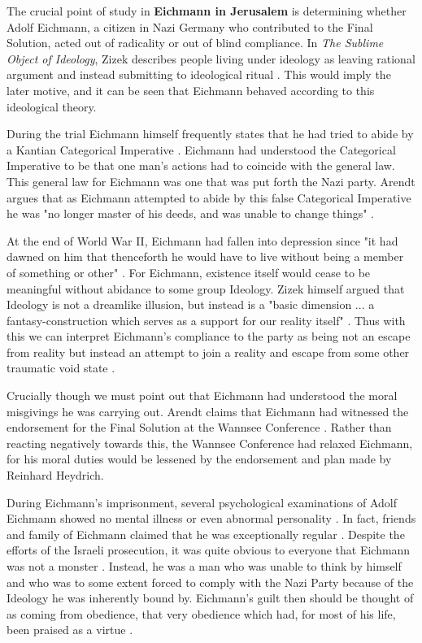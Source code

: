\documentclass[a4paper, 11pt]{article} %
\begin{document}
The crucial point of study in \textbf{Eichmann in Jerusalem} is determining whether Adolf Eichmann, a citizen in Nazi Germany who contributed to the Final Solution, acted out of radicality or out of blind compliance.  In \textit{The Sublime Object of Ideology}, Zizek describes people living under ideology as leaving rational argument and instead submitting to ideological ritual \cite{Zizek}.  This would imply the later motive, and it can be seen that Eichmann behaved according to this ideological theory.  

During the trial Eichmann himself frequently states that he had tried to abide by a Kantian Categorical Imperative \cite{Arendt}.   Eichmann had understood the Categorical Imperative to be that one man's actions had to coincide with the general law.  This general law for Eichmann was one that was put forth the Nazi party.  Arendt argues that as Eichmann attempted to abide by this false Categorical Imperative he was "no longer master of his deeds, and was unable to change things" \cite{Arendt}.  

At the end of World War II, Eichmann had fallen into depression since "it had dawned on him that thenceforth he would have to live without being a member of something or other" \cite{Arendt}.  For Eichmann, existence itself would cease to be meaningful without abidance to some group Ideology.  Zizek himself argued that Ideology is not a dreamlike illusion, but instead is a "basic dimension ... a fantasy-construction which serves as a support for our reality itself" \cite{Zizek}.  Thus with this we can interpret Eichmann's compliance to the party as being not an escape from reality but instead an attempt to join a reality and escape from some other traumatic void state \cite{Zizek}.  

Crucially though we must point out that Eichmann had understood the moral misgivings he was carrying out.  Arendt claims that Eichmann had witnessed the endorsement for the Final Solution at the Wannsee Conference \cite{Arendt}.  Rather than reacting negatively towards this, the Wannsee Conference had relaxed Eichmann, for his moral duties would be lessened by the endorsement and plan made by Reinhard Heydrich.  

During Eichmann's imprisonment, several psychological examinations of Adolf Eichmann showed no mental illness or even abnormal personality \cite{Arendt}.  In fact, friends and family of Eichmann claimed that he was exceptionally regular \cite{Arendt}.  Despite the efforts of the Israeli prosecution, it was quite obvious to everyone that Eichmann was not a monster \cite{Arendt}.  Instead, he was a man who was unable to think by himself and who was to some extent forced to comply with the Nazi Party because of the Ideology he was inherently bound by.  Eichmann's guilt then should be thought of as coming from obedience, that very obedience which had, for most of his life, been praised as a virtue \cite{Arendt}.  
\end{document}
